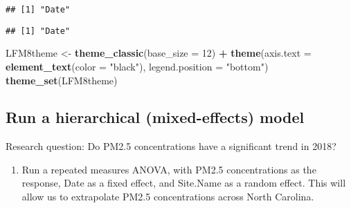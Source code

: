 \documentclass[]{article}
\newenvironment{Shaded}{\begin{snugshade}}{\end{snugshade}}
\newcommand{\KeywordTok}[1]{\textcolor[rgb]{0.13,0.29,0.53}{\textbf{#1}}}
\newcommand{\DataTypeTok}[1]{\textcolor[rgb]{0.13,0.29,0.53}{#1}}
\newcommand{\DecValTok}[1]{\textcolor[rgb]{0.00,0.00,0.81}{#1}}
\newcommand{\StringTok}[1]{\textcolor[rgb]{0.31,0.60,0.02}{#1}}
\newcommand{\CommentTok}[1]{\textcolor[rgb]{0.56,0.35,0.01}{\textit{#1}}}
\newcommand{\OperatorTok}[1]{\textcolor[rgb]{0.81,0.36,0.00}{\textbf{#1}}}
\newcommand{\NormalTok}[1]{#1}
\providecommand{\tightlist}{%
  \setlength{\itemsep}{0pt}\setlength{\parskip}{0pt}}
\begin{document}
\begin{verbatim}
## [1] "Date"
\end{verbatim}

\begin{Shaded}
\end{Shaded}

\begin{verbatim}
## [1] "Date"
\end{verbatim}

\begin{Shaded}
\begin{Highlighting}[]
\NormalTok{LFM8theme <-}\StringTok{ }\KeywordTok{theme_classic}\NormalTok{(}\DataTypeTok{base_size =} \DecValTok{12}\NormalTok{) }\OperatorTok{+}
\StringTok{  }\KeywordTok{theme}\NormalTok{(}\DataTypeTok{axis.text =} \KeywordTok{element_text}\NormalTok{(}\DataTypeTok{color =} \StringTok{"black"}\NormalTok{), }
        \DataTypeTok{legend.position =} \StringTok{"bottom"}\NormalTok{)}
\KeywordTok{theme_set}\NormalTok{(LFM8theme)}
\end{Highlighting}
\end{Shaded}

\subsection{Run a hierarchical (mixed-effects)
model}\label{run-a-hierarchical-mixed-effects-model}

Research question: Do PM2.5 concentrations have a significant trend in
2018?

\begin{enumerate}
\def\labelenumi{\arabic{enumi}.}
\setcounter{enumi}{2}
\tightlist
\item
  Run a repeated measures ANOVA, with PM2.5 concentrations as the
  response, Date as a fixed effect, and Site.Name as a random effect.
  This will allow us to extrapolate PM2.5 concentrations across North
  Carolina.
\end{enumerate}
\end{document}
